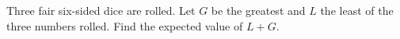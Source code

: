 Three fair six-sided dice are rolled. Let $G$ be the greatest and $L$ the least of the three numbers rolled. Find the expected value of $L+G$.
